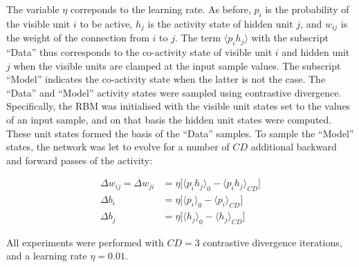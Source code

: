 \documentclass[11pt]{article}
\begin{document}
The variable $\eta$ correponds to the learning rate. As before, $p_i$
is the probability of the visible unit $i$ to be active, $h_j$ is the
activity state of hidden unit $j$, and $w_{ij}$ is the weight of the
connection from $i$ to $j$. The term $\langle p_{i}h_{j} \rangle$ with
the subscript ``Data'' thus corresponds to the co-activity state of
visible unit $i$ and hidden unit $j$ when the visible units are
clamped at the input sample values. The subscript ``Model'' indicates
the co-activity state when the latter is not the case.
The ``Data'' and ``Model'' activity states were sampled using
contrastive divergence. Specifically, the RBM was initialised with the
visible unit states set to the values of an input sample, and on that
basis the hidden unit states were computed. These unit states formed
the basis of the ``Data'' samples.  To sample the ``Model'' states,
the network was let to evolve for a number of $CD$ additional backward
and forward passes of the activity:

\begin{align}
  \label{eq:cd_update_equations}
  \Delta w_{ij} = \Delta w_{ji} &= \eta \Big[\langle p_{i}h_{j} \rangle_{0} - \langle p_{i}h_{j} \rangle_{CD}\Big] \\
  \Delta b_{i}                  &= \eta \Big[\langle p_{i}      \rangle_{0} - \langle p_{i}      \rangle_{CD}\Big] \\
  \Delta b_{j}                  &= \eta \Big[\langle h_{j}      \rangle_{0} - \langle h_{j}      \rangle_{CD}\Big]
\end{align}

All experiments were performed with $CD=3$ contrastive divergence
iterations, and a learning rate $\eta = 0.01$.


\end{document}

